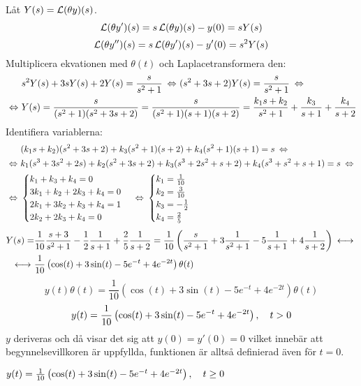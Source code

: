 \begin{task}{5.12}
	Låt $Y(s)=\operatorname{\mathcal{L}}(\theta y)(s)$.
	\[\operatorname{\mathcal{L}}(\theta y')(s)=s\operatorname{\mathcal{L}}(\theta y)(s)-y(0)=sY(s)\]
	\[\operatorname{\mathcal{L}}(\theta y'')(s)=s\operatorname{\mathcal{L}}(\theta y')(s)-y'(0)=s^2Y(s)\]
	Multiplicera ekvationen med $\theta(t)$ och Laplacetransformera den:
	\begin{align*}
	&s^2Y(s)+3sY(s)+2Y(s)=\frac{s}{s^2+1} \lra
	(s^2+3s+2)Y(s)=\frac{s}{s^2+1} \lra \\ \lra
	&Y(s)=\frac{s}{(s^2+1)(s^2+3s+2)}=
	\frac{s}{(s^2+1)(s+1)(s+2)}=
	\frac{k_1s+k_2}{s^2+1}+\frac{k_3}{s+1}+\frac{k_4}{s+2}
	\end{align*}
	Identifiera variablerna:
	\begin{align*}
	&(k_1s+k_2)(s^2+3s+2)+k_3(s^2+1)(s+2)+k_4(s^2+1)(s+1)=s \lra \\ \lra
	&k_1(s^3+3s^2+2s)+k_2(s^2+3s+2)+k_3(s^3+2s^2+s+2)+k_4(s^3+s^2+s+1)=s \lra \\ \lra
	&\begin{cases}
	k_1+k_3+k_4=0 \\
	3k_1+k_2+2k_3+k_4=0 \\
	2k_1+3k_2+k_3+k_4=1 \\
	2k_2+2k_3+k_4=0
	\end{cases} \lra
	\begin{cases}
	k_1=\frac{1}{10} \\
	k_2=\frac{3}{10} \\
	k_3=-\frac{1}{2} \\
	k_4=\frac{2}{5}
	\end{cases}
	\end{align*}
	\begin{align*}
	Y(s)=
	&\frac{1}{10}\*\frac{s+3}{s^2+1}-\frac{1}{2}\*\frac{1}{s+1}+\frac{2}{5}\*\frac{1}{s+2}=
	\frac{1}{10}\left(\frac{s}{s^2+1}+3\frac{1}{s^2+1}-5\frac{1}{s+1}+4\frac{1}{s+2}\right) \llra \\ \llra
	&\frac{1}{10}\left(\cos(t)+3\sin(t)-5e^{-t}+4e^{-2t}\right)\theta(t)
	\end{align*}
	\[y(t)\theta(t)=\frac{1}{10}\left(\cos(t)+3\sin(t)-5e^{-t}+4e^{-2t}\right)\theta(t)\]
	\[y(t)=\frac{1}{10}\left(\cos(t)+3\sin(t)-5e^{-t}+4e^{-2t}\right), \quad t>0\]
	$y$ deriveras och då visar det sig att $y(0)=y'(0)=0$ vilket innebär att begynnelsevillkoren är uppfyllda, funktionen är alltså definierad även för $t=0$.
	
	\ans $y(t)=\frac{1}{10}\left(\cos(t)+3\sin(t)-5e^{-t}+4e^{-2t}\right), \quad t\ge0$
\end{task}
